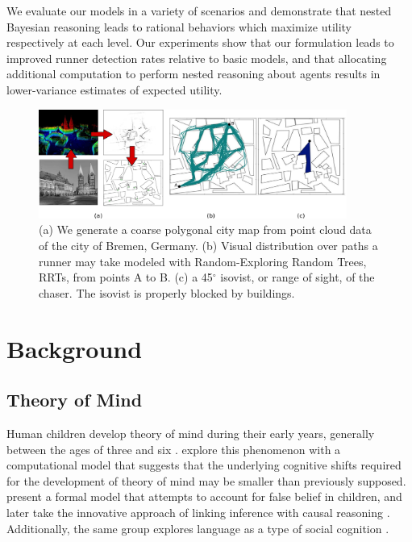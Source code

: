 \documentclass[twoside]{article}
\begin{document}
We evaluate our models in a variety of scenarios and demonstrate that nested Bayesian reasoning leads to rational behaviors which maximize utility respectively at each level. Our experiments show that our formulation leads to improved runner detection rates relative to basic models, and that allocating additional computation to perform nested reasoning about agents results in lower-variance estimates of expected utility. 






\begin{figure}
\begin{center}
\vspace{-1.0em}
\centerline{\includegraphics[width=0.9\textwidth]{sim_primitives.pdf}}
\caption{(a) We generate a coarse polygonal city map from point cloud data of the city of Bremen, Germany. (b) Visual distribution over paths a runner may take
modeled with Random-Exploring Random Trees, RRTs, from points A to B. (c) a 45$^{\circ}$ isovist, or range of sight, of the
chaser.  The isovist is properly blocked by buildings.}
\label{fig:rrt}
\end{center}
\vspace{-1.0em}
\end{figure} 

\section{Background}

\vspace{-0.5em}
\subsection{Theory of Mind}

Human children develop theory of mind during their
early years, generally between the ages of three and
six
\cite{wellman1990child,chater2006probabilistic}. \textcite{bello2006developmental}
explore this phenomenon with a computational model that suggests that the underlying cognitive shifts required for the development of theory of mind may be smaller than previously supposed. 
%
\textcite{goodman2006intuitive} present a formal model that
attempts to account for false belief in
children, and later take the innovative approach of
linking inference with causal reasoning \cite{goodman2009cause}. Additionally, the same group explores language as a type of social
cognition \cite{goodman2013knowledge}.
%
\end{document}
